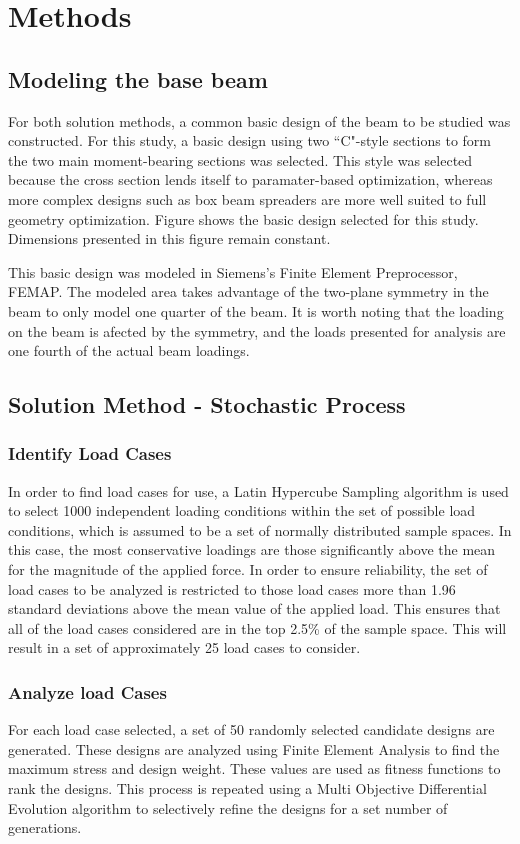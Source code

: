 \chapter{Methods}
\section{Modeling the base beam}
For both solution methods, a common basic design of the beam to be studied was constructed. For this study, a basic design using two ``C"-style sections to form the two main moment-bearing sections was selected. This style was selected because the cross section lends itself to paramater-based optimization, whereas more complex designs such as box beam spreaders are more well suited to full geometry optimization.  Figure  shows the basic design selected for this study. Dimensions presented in this figure remain constant. 

This basic design was modeled in Siemens's Finite Element Preprocessor, FEMAP. The modeled area takes advantage of the two-plane symmetry in the beam to only model one quarter of the beam. It is worth noting that the loading on the beam is afected by the symmetry, and the loads presented for analysis are one fourth of the actual beam loadings. 

\section{Solution Method - Stochastic Process}
\subsection{Identify Load Cases}
In order to find load cases for use, a Latin Hypercube Sampling algorithm is used to select 1000 independent loading conditions within the set of possible load conditions, which is assumed to be a set of normally distributed sample spaces. In this case, the most conservative loadings are those significantly above the mean for the magnitude of the applied force. In order to ensure reliability, the set of load cases to be analyzed is restricted to those load cases more than 1.96 standard deviations above the mean value of the applied load. This ensures that all of the load cases considered are in the top 2.5\% of the sample space. This will result in a set of approximately 25 load cases to consider. 
\subsection{Analyze load Cases} 
For each load case selected, a set of 50 randomly selected candidate designs are generated. These designs are analyzed using Finite Element Analysis to find the maximum stress and design weight. These values are used as fitness functions to rank the designs. This process is repeated using a Multi Objective Differential Evolution algorithm to selectively refine the designs for a set number of generations. 
